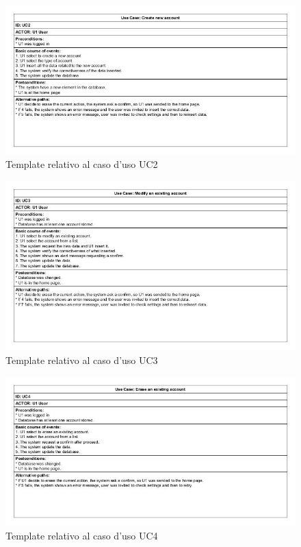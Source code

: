 \documentclass[a4paper,10pt]{report}
\begin{document}
			\begin{figure}[htbp]
				\centering
				\includegraphics[width = \textwidth]{immagini/USE_CASE_TEMPLATE/UC02.jpg}
				\caption{Template relativo al caso d'uso UC2}
				\end{figure}
			\begin{figure}[htbp]
				\centering
				\includegraphics[width = \textwidth]{immagini/USE_CASE_TEMPLATE/UC03.jpg}
				\caption{Template relativo al caso d'uso UC3}
				\end{figure}
			\begin{figure}[htbp]
				\centering
				\includegraphics[width = \textwidth]{immagini/USE_CASE_TEMPLATE/UC04.jpg}
				\caption{Template relativo al caso d'uso UC4}
				\end{figure}
\end{document}
